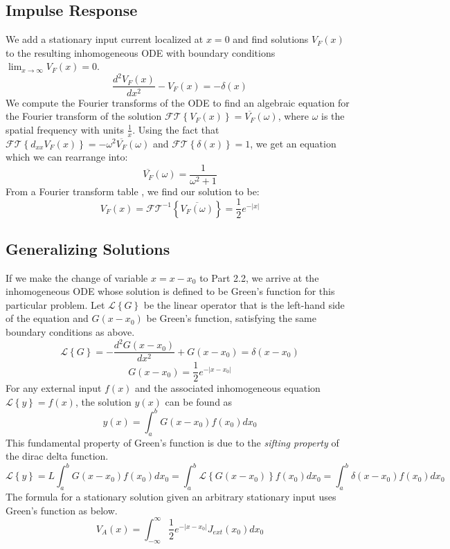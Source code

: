 \documentclass[12pt]{article}
\begin{document}
\subsection{Impulse Response}
We add a stationary input current localized at $x=0$ and find solutions $V_F(x)$ to the resulting inhomogeneous ODE with boundary conditions $\lim_{x\to\infty} V_F(x) = 0$.
\begin{equation} \label{pm_odeN}
\frac{d^2{V_F(x)}}{d{x^2}} - V_F(x) = -\delta(x)
\end{equation}
We compute the Fourier transforms of the ODE to find an algebraic equation for the Fourier transform of the solution $\mathcal{FT}\left\{V_F(x)\right\} = \overline{V_F}(\omega)$, where $\omega$ is the spatial frequency with units $\frac{1}{x}$. Using the fact that $\mathcal{FT}\left\{d_{xx}V_F(x)\right\} = -\omega^2\overline{V_F}(\omega)$ and $ \mathcal{FT}\left\{\delta(x)\right\} = 1$, we get an equation which we can rearrange into:
$$  \overline{V_F}(\omega) = \frac{1}{\omega^2+1} $$
From a Fourier transform table \cite{fourier}, we find our solution to be:
$$ V_F(x) = \mathcal{FT}^{-1}\left\{\overline{V_F(\omega)}\right\} =  \frac{1}{2}e^{-|x|} $$

\subsection{Generalizing Solutions}
If we make the change of variable $x = x-x_0$ to Part 2.2, we arrive at the inhomogeneous ODE whose solution is defined to be Green's function for this particular problem. Let $\mathcal{L}\left\{G\right\}$ be the linear operator that is the left-hand side of the equation and $G(x-x_0)$ be Green's function, satisfying the same boundary conditions as above.
\begin{equation} \label{pm_greens}
\mathcal{L}\left\{G\right\} = -\frac{d^2{G(x-x_0)}}{d{x^2}} + G(x-x_0) = \delta(x-x_0)
\end{equation}
$$ G(x-x_0) = \frac{1}{2}e^{-| x-x_0 |} $$
For any external input $f(x)$ and the associated inhomogeneous equation $\mathcal{L}\left\{y\right\} = f(x)$, the solution $y(x)$ can be found as
$$ y(x) = \int_{a}^{b}G(x-x_0)f(x_0)dx_0 $$
This fundamental property of Green's function is due to the \textit{sifting property} of the dirac delta function. 
$$\mathcal{L}\left\{y\right\} = L\int_a^bG(x-x_0)f(x_0)dx_0 = \int_a^b\mathcal{L}\left\{G(x-x_0)\right\}f(x_0)dx_0 = \int_a^b\delta(x-x_0)f(x_0)dx_0 $$
The formula for a stationary solution given an arbitrary stationary input uses Green's function as below.
$$V_A(x) = \int_{-\infty}^{\infty}\frac{1}{2}e^{-|x-x_0|}J_{ext}(x_0)dx_0 $$
\end{document}
